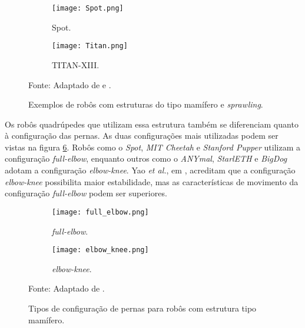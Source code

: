 \documentclass[conference]{IEEEtran}
\begin{document}
\begin{figure}[htbp]
    \centering
    \begin{subfigure}[htbp]{0.23\textwidth}
        \centering
        \texttt{[image: Spot.png]}
        \caption{Spot.}
        \label{fig:robots_structures_b}
    \end{subfigure}
    \begin{subfigure}[htbp]{0.23\textwidth}
        \centering
        \texttt{[image: Titan.png]}
        \caption{TITAN-XIII.}
        \label{fig:robots_structures_c}
    \end{subfigure}
    \centering
    \caption{Exemplos de robôs com estruturas do tipo mamífero e \textit{sprawling}.}
    Fonte: Adaptado de  \cite{Kitano2016} e \cite{SpotImg1}.
    \label{fig:robots_structures}
\end{figure}

Os robôs quadrúpedes que utilizam essa estrutura também se diferenciam quanto à configuração das pernas. As duas configurações mais utilizadas podem ser vistas na figura \ref{fig:joint_configurations}. Robôs como o \textit{Spot}, \textit{MIT Cheetah} e \textit{Stanford Pupper} utilizam a configuração \textit{full-elbow}, enquanto outros como o \textit{ANYmal}, \textit{StarlETH} e \textit{BigDog} adotam a configuração \textit{elbow-knee}. Yao \textit{et al.}, em \cite{Yao2021}, acreditam que a configuração \textit{elbow-knee} possibilita maior estabilidade, mas as características de movimento da configuração \textit{full-elbow} podem ser superiores.

\begin{figure}[htbp]
  \centering
  \begin{subfigure}[htbp]{0.24\textwidth}
    \centering
    \texttt{[image: full\_elbow.png]}
    \caption{\textit{full-elbow}.}
    \label{fig:joint_configurations_a}
  \end{subfigure}
  \begin{subfigure}[htbp]{0.24\textwidth}
      \centering
      \texttt{[image: elbow\_knee.png]}
      \caption{\textit{elbow-knee}.}
      \label{fig:joint_configurations_d}
  \end{subfigure}

  \caption{Tipos de configuração de pernas para robôs com estrutura tipo mamífero.}
  Fonte: Adaptado de \cite{Yao2021}.
  \label{fig:joint_configurations}
\end{figure}
\end{document}
